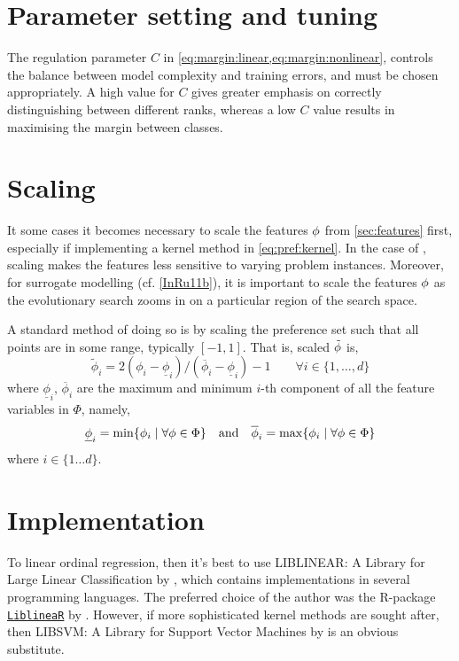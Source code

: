 \section{Parameter setting and tuning}
The regulation parameter $C$ in \cref{eq:margin:linear,eq:margin:nonlinear}, 
controls the balance between model complexity and training errors, and must be 
chosen appropriately. A high value for $C$ gives greater emphasis on correctly 
distinguishing between different ranks, whereas a low $C$ value results in 
maximising the margin between classes.

\section{Scaling}\label{app:feat:scaling}
It some cases it becomes necessary to scale the features ${\mathbf{\phi}}$ from 
\cref{sec:features} first, especially if implementing a kernel method in 
\cref{eq:pref:kernel}.
In the case of \JSP, scaling makes the features less sensitive to varying 
problem instances.
Moreover, for surrogate modelling (cf. \cref{InRu11b}), it is important to 
scale the features ${\mathbf{\phi}}$ as the evolutionary search zooms in on a particular 
region of the search space. 

A standard method of doing so is by scaling the preference set such that all 
points are in some range, typically $[-1,1]$. That is, scaled $\tilde{{\mathbf{\phi}}}$ 
is,
\begin{equation}\label{eq:scale}
\tilde{\phi}_i = 2 (\phi_i - \underline{\phi}_i) / (\overline{\phi}_i - 
\underline{\phi}_i) - 1 
\quad\quad \forall i\in\{1,\ldots,d\}
\end{equation}
where $\underline{\phi}_i$, $\overline{\phi}_i$ are the maximum and minimum 
$i$-th component of all the feature variables in $\Phi$, namely,
\begin{equation}
\underline{\phi}_i=\min\{\phi_i\;|\;\forall{\mathbf{\phi}}\in \Phi\} 
\quad\textrm{and}\quad \overline{\phi}_i=\max\{\phi_i\;|\;\forall{\mathbf{\phi}}\in 
\Phi\}
\end{equation}
where $i\in\{1\ldots d\}$. 

\section{Implementation}
To linear ordinal regression, then it's best to use LIBLINEAR: A 
Library for Large Linear Classification by \citet{main:LIBLINEAR}, which 
contains implementations in several programming languages. The preferred choice 
of the author was the R-package 
\href{https://cran.r-project.org/web/packages/LiblineaR/}{\texttt{LiblineaR}} 
by \citet{cran:LiblineaR}.
However, if more sophisticated kernel methods are sought after, then {LIBSVM}: 
A Library for Support Vector Machines by 
\citet{main:LIBSVM} is an obvious substitute.

